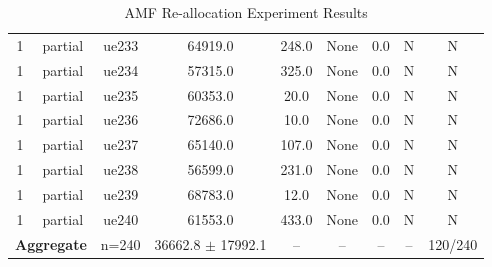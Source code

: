 \begin{table}[ht]
\begin{tabular}{|c|c|c|c|c|c|c|c|c|}
1 & partial & ue233 & 64919.0 & 248.0 & None & 0.0 & N & N \\
1 & partial & ue234 & 57315.0 & 325.0 & None & 0.0 & N & N \\
1 & partial & ue235 & 60353.0 & 20.0 & None & 0.0 & N & N \\
1 & partial & ue236 & 72686.0 & 10.0 & None & 0.0 & N & N \\
1 & partial & ue237 & 65140.0 & 107.0 & None & 0.0 & N & N \\
1 & partial & ue238 & 56599.0 & 231.0 & None & 0.0 & N & N \\
1 & partial & ue239 & 68783.0 & 12.0 & None & 0.0 & N & N \\
1 & partial & ue240 & 61553.0 & 433.0 & None & 0.0 & N & N \\
\multicolumn{2}{|c|}{\textbf{Aggregate}} & n=240 & 36662.8 $\pm$ 17992.1 & -- & -- & -- & -- & 120/240 \\
\hline
\end{tabular}
\caption{AMF Re-allocation Experiment Results}
\label{tab:amf_realloc}
\end{table}
